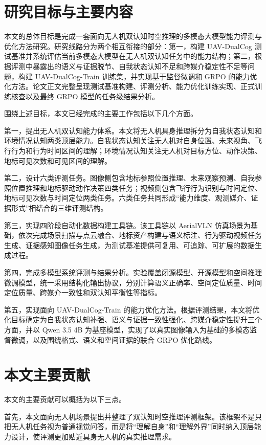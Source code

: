 \section{研究目标与主要内容}

本文的总体目标是完成一套面向无人机双认知时空推理的多模态大模型能力评测与优化方法研究。研究线路分为两个相互衔接的部分：第一，构建 UAV-DualCog 测试基准并系统评估当前多模态大模型在无人机双认知任务中的能力结构；第二，根据评测中暴露出的语义与证据脱节、自我状态认知不足和跨媒介稳定性不足等问题，构建 UAV-DualCog-Train 训练集，并实现基于监督微调和 GRPO 的能力优化方法。论文正文完整呈现测试基准构建、评测分析、能力优化训练实现、正式训练核查以及最终 GRPO 模型的任务级结果分析。

围绕上述目标，本文已经完成的主要工作包括以下几个方面。

第一，提出无人机双认知能力体系。本文将无人机具身推理拆分为自我状态认知和环境情况认知两类顶层能力。自我状态认知关注无人机对自身位置、未来视角、飞行行为和行为时间区间的理解；环境情况认知关注无人机对目标方位、动作决策、地标可见次数和可见区间的理解。

第二，设计六类评测任务。图像侧包含地标参照位置推理、未来观察预测、自我参照位置推理和地标驱动动作决策四类任务；视频侧包含飞行行为识别与时间定位、地标可见次数与时间定位两类任务。六类任务共同形成“能力维度、观测媒介、证据形式”相结合的三维评测结构。

第三，实现四阶段自动化数据构建工具链。该工具链以 AerialVLN 仿真场景为基础，依次完成场景扫描与点云融合、地标资产构建与语义标注、行为驱动视频任务生成、证据感知图像任务生成，为测试基准提供可复用、可追踪、可扩展的数据生成过程。

第四，完成多模型系统评测与结果分析。实验覆盖闭源模型、开源模型和空间推理微调模型，统一采用结构化输出协议，分别计算语义正确率、空间定位质量、时间定位质量、跨媒介一致性和双认知平衡性等指标。

第五，实现面向 UAV-DualCog-Train 的能力优化方法。根据评测结果，本文将优化目标确定为自我状态认知补强、语义与证据一致性强化、跨媒介稳定性提升三个方面，并以 Qwen 3.5 4B 为基座模型，实现了以真实图像输入为基础的多模态监督微调，以及围绕格式、语义和空间证据的联合 GRPO 优化路线。

\section{本文主要贡献}

本文的主要贡献可以概括为以下三点。

首先，本文面向无人机场景提出并整理了双认知时空推理评测框架。该框架不是只把无人机任务视为普通视觉问答，而是将“理解自身”和“理解外界”同时纳入顶层能力设计，使评测更加贴近具身无人机的真实推理需求。

